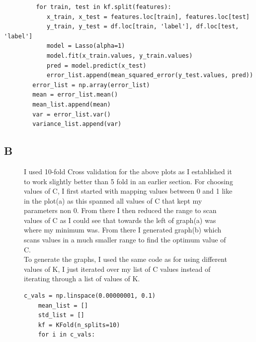 \documentclass[11pt]{article} %
\begin{document}
 \begin{verbatim}
         for train, test in kf.split(features):
            x_train, x_test = features.loc[train], features.loc[test]
            y_train, y_test = df.loc[train, 'label'], df.loc[test, 'label']
            model = Lasso(alpha=1)
            model.fit(x_train.values, y_train.values)
            pred = model.predict(x_test)
            error_list.append(mean_squared_error(y_test.values, pred))
        error_list = np.array(error_list)
        mean = error_list.mean()
        mean_list.append(mean)
        var = error_list.var()
        variance_list.append(var)
 \end{verbatim}
\subsection{B}
\begin{figure}[h]
\qquad
{}
I used 10-fold Cross validation for the above plots as I established it to work slightly better than 5 fold in an earlier section. For choosing values of C, I first started with mapping values between 0 and 1 like in the plot(a) as this spanned all values of C that kept my parameters non 0. From there I then reduced the range to scan values of C as I could see that towards the left of graph(a) was where my minimum was. From there I generated graph(b) which scans values in a much smaller range to find the optimum value of C.
\\
To generate the graphs, I used the same code as for using different values of K, I just iterated over my list of C values instead of iterating through a list of values of K.
\begin{verbatim}
c_vals = np.linspace(0.00000001, 0.1)
    mean_list = []
    std_list = []
    kf = KFold(n_splits=10)
    for i in c_vals:
\end{verbatim}


\end{figure}
\end{document}
